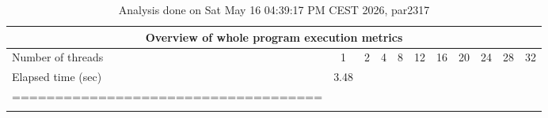 \begin{table}[h]
\begin{center}
\begin{tabular}{|l|c|c|c|c|c|c|c|c|c|c|}
\hline
\multicolumn{11}{|c|}{Overview of whole program execution metrics} \\
\hline
\hline
Number of threads & 1 & 2 & 4 & 8 & 12 & 16 & 20 & 24 & 28 & 32 \\
\hline
Elapsed time (sec)      &       3.48 \\
\hline
==================================== \\
\hline
 \\
\hline
\end{tabular}
\end{center}
\caption{ Analysis done on Sat May 16 04:39:17 PM CEST 2026, par2317}
\end{table}
